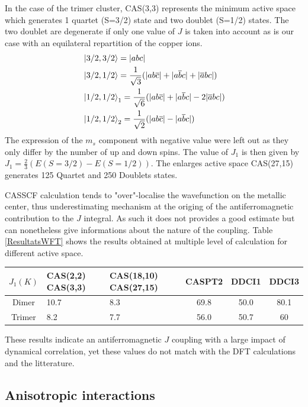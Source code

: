 \documentclass[10pt]{report}
\numberwithin{equation}{section}
\begin{document}
In the case of the trimer cluster, CAS(3,3) represents the minimum active space which generates 1 quartet (S=3/2) state and two doublet (S=1/2) states. The two doublet are degenerate if only one value of $J$ is taken into account as is our case with an equilateral repartition of the copper ions.
\begin{align}
    &\ket{3/2,3/2}=|abc|\\
    &\ket{3/2,1/2}=\frac{1}{\sqrt{3}}(|ab\overline{c}|+|a\overline{b}c|+|\overline{a}bc|)\\
    &\ket{1/2,1/2}_1=\frac{1}{\sqrt{6}}(|ab\overline{c}|+|a\overline{b}c|-2|\overline{a}bc|)\\
    &\ket{1/2,1/2}_2=\frac{1}{\sqrt{2}}(|ab\overline{c}|-|a\overline{b}c|)
\end{align}
The expression of the $m_s$ component with negative value were left out as they only differ by the number of up and down spins.
The value of $J_1$ is then given by $J_1=\frac{2}{3}(E(S=3/2)-E(S=1/2))$.
The enlarges active space CAS(27,15) generates 125 Quartet and 250 Doublets states.

CASSCF calculation tends to "over"-localise the wavefunction on the metallic center, thus underestimating mechanism at the origing of the antiferromagnetic contribution to the $J$ integral.
As such it does not provides a good estimate but can nonetheless give informations about the nature of the coupling.
Table \ref{ResultatsWFT} shows the results obtained at multiple level of calculation for different active space.

\begin{center}\label{ResultatsWFT}
    \begin{tabular}{c m{8em} m{10em} c c c }
        \hline
        $J_1 (K)$ & CAS(2,2) CAS(3,3) & CAS(18,10) CAS(27,15) & CASPT2 & DDCI1  & DDCI3  \\
        \hline
        Dimer & 10.7 & 8.3 & 69.8 & 50.0 & 80.1 \\
        Trimer & 8.2 & 7.7 & 56.0  & 50.7 & 60 \\
        \hline
    \end{tabular}
\end{center}

These results indicate an antiferromagnetic $J$ coupling with a large impact of dynamical correlation, yet these values do not match with the DFT calculations and the litterature.

\subsection{Anisotropic interactions}
\end{document}
